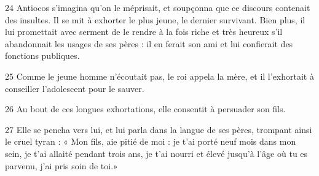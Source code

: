 24 Antiocos s’imagina qu’on le méprisait, et soupçonna que ce discours contenait des insultes. Il se mit à exhorter le plus jeune, le dernier survivant. Bien plus, il lui promettait avec serment de le rendre à la fois riche et très heureux s’il abandonnait les usages de ses pères : il en ferait son ami et lui confierait des fonctions publiques.

25 Comme le jeune homme n’écoutait pas, le roi appela la mère, et il l’exhortait à conseiller l’adolescent pour le sauver.

26 Au bout de ces longues exhortations, elle consentit à persuader son fils.

27 Elle se pencha vers lui, et lui parla dans la langue de ses pères, trompant ainsi le cruel tyran : « Mon fils, aie pitié de moi : je t’ai porté neuf mois dans mon sein, je t’ai allaité pendant trois ans, je t’ai nourri et élevé jusqu’à l’âge où tu es parvenu, j’ai pris soin de toi.»
